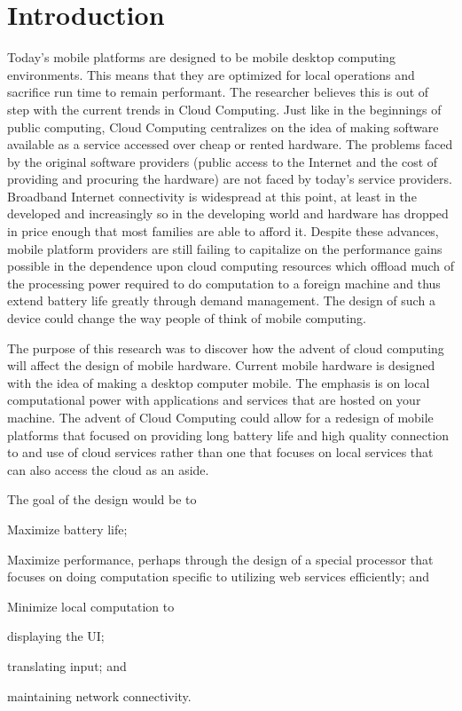 \documentclass[12pt,oneside,letterpaper,titlepage]{report}
\begin{document}
\chapter{Introduction}

\newpage

Today's mobile platforms are designed to be mobile desktop computing
environments.  This means that they are optimized for local operations and
sacrifice run time to remain performant.  The researcher believes this is out of
step with the current trends in Cloud Computing.  Just like in the beginnings of
public computing, Cloud Computing centralizes on the idea of making software
available as a service accessed over cheap or rented hardware.  The problems
faced by the original software providers (public access to the Internet and the
cost of providing and procuring the hardware) are not faced by today's service
providers.  Broadband Internet connectivity is widespread at this point, at
least in the developed and increasingly so in the developing world and hardware
has dropped in price enough that most families are able to afford it.  Despite
these advances, mobile platform providers are still failing to capitalize on the
performance gains possible in the dependence upon cloud computing resources
which offload much of the processing power required to do computation to a
foreign machine and thus extend battery life greatly through demand management.
The design of such a device could change the way people of think of mobile
computing.

The purpose of this research was to discover how the advent of cloud computing
will affect the design of mobile hardware.  Current mobile hardware is designed
with the idea of making a desktop computer mobile.  The emphasis is on local
computational power with applications and services that are hosted on your
machine.  The advent of Cloud Computing could allow for a redesign of mobile
platforms that focused on providing long battery life and high quality
connection to and use of cloud services rather than one that focuses on local
services that can also access the cloud as an aside.

The goal of the design would be to 
\begin{inparaenum}[(1)]
\item Maximize battery life;
\item Maximize performance, perhaps through the design of a special processor
  that focuses on doing computation specific to utilizing web services
  efficiently; and
\item Minimize local computation to 
  \begin{inparaenum}[(a)]
  \item displaying the UI;
  \item translating input; and
  \item maintaining network connectivity.
  \end{inparaenum}
\end{inparaenum}
\end{document}
